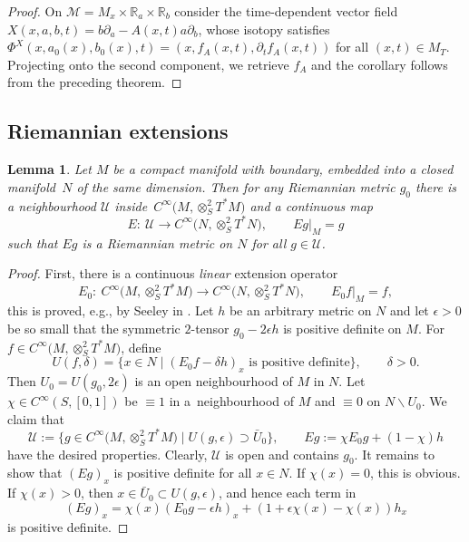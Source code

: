 \documentclass[10pt,a4paper]{amsart}
\numberwithin{equation}{section}
\newtheorem{Lemma}[Theorem]{Lemma}
\theoremstyle{definition}
\newcommand{\R}{\mathbb{R}} %
\newcommand{\1}{{\bf 1}}
\begin{document}
\begin{proof}
	On $\mathcal M = M_x \times \R_a\times \R_b$ consider the time-dependent vector field $X(x,a,b,t)={b \partial_a - A(x,t)a \partial_b}$, whose isotopy satisfies $\Phi^X(x,a_0(x),b_0(x),t)=(x,f_A(x,t),\partial_t f_A(x,t))$ for all ${(x,t)\in M_T}$. Projecting onto the second component, we retrieve $f_A$ and the corollary follows from the preceding theorem.
\end{proof}


\subsection{Riemannian extensions}

\begin{Lemma}\label{lem_rext}
Let $M$ be a compact manifold with boundary, embedded into a closed manifold~$N$ of the same dimension. Then for any Riemannian metric $g_0$ there is a neighbourhood $\mathcal U$ inside~$C^\infty\bigl(M,\otimes^2_ST^*M\bigr)$ and a continuous map
\[
	E\colon\ \mathcal U \rightarrow C^\infty\bigl(N,\otimes^2_ST^*N\bigr), \qquad Eg|_{M}=g
\]
such that $Eg$ is a Riemannian metric on $N$ for all $g\in \mathcal U$.
\end{Lemma}

 \begin{proof} First, there is a continuous {\it linear} extension operator
\begin{equation*}
E_0\colon\ C^\infty\bigl(M,\otimes_S^2T^*M\bigr)\rightarrow C^\infty\bigl(N,\otimes_S^2T^*N\bigr),\qquad E_0f\vert_M = f,
\end{equation*}
this is proved, e.g., by Seeley in \cite{See64}. Let $h$ be an arbitrary metric on $N$ and let $\epsilon>0$ be so small that the symmetric $2$-tensor $g_0 - 2\epsilon h$ is positive definite on $M$. For $f\in C^\infty\bigl(M,\otimes_S^2T^*M\bigr)$, define
\begin{equation*}
U(f,\delta) =\{x\in N\mid (E_0f-\delta h)_x \text{ is positive definite}\}, \qquad \delta>0.
\end{equation*}
Then $U_0=U(g_0,2\epsilon)$ is an open neighbourhood of $M$ in $N$. Let $\chi\in C^\infty(S,[0,1])$ be $\equiv 1$ in a~neighbourhood of $M$ and $\equiv 0$ on $N\backslash U_0$. We claim that
\[
\mathcal U :=\bigl\{g\in C^\infty\bigl(M,\otimes^2_S T^*M\bigr)\mid U(g,\epsilon)\supset \bar U_0\bigr\},\qquad Eg := \chi E_0g + (1-\chi)h
\]
have the desired properties. Clearly, $\mathcal U$ is open and contains $g_0$. It remains to show that $(Eg)_x$ is positive definite for all $x\in N$. If $\chi(x)=0$, this is obvious. If $\chi(x)>0$, then $x\in \bar U_0\subset U(g,\epsilon)$, and hence each term in
\begin{equation*}
(Eg)_x = \chi(x)(E_0g-\epsilon h)_x + (1+\epsilon \chi(x) - \chi(x))h_x
\end{equation*}
is positive definite.
\end{proof}
\end{document}
